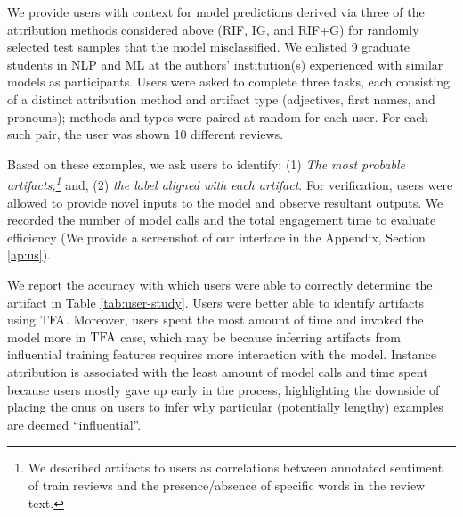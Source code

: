 \documentclass[11pt]{article}
\begin{document}
We provide %
users with context for model predictions derived via three of the attribution methods considered above (RIF, IG, and RIF+G) for randomly selected test samples that the model misclassified.
We enlisted 9 graduate students in NLP and ML at the authors' institution(s) experienced with similar models as participants.
Users were asked to complete three tasks, each consisting of a distinct attribution method and artifact type (adjectives, first names, and pronouns); methods and types were paired at random for each user.
For each such pair, the user was shown 10 different reviews. %

Based on these examples, we ask users to identify: (1) \textit{The most probable artifacts,\footnote{We described artifacts to users as correlations between annotated sentiment of train reviews and the presence/absence of specific words in the review text.}} and, (2) \textit{the label aligned with each artifact}. 
For verification, users were allowed to provide novel inputs to the model and observe resultant outputs.
We %
recorded the number of model calls and the total engagement time to
evaluate efficiency (We provide a screenshot of our interface in the Appendix, Section \ref{ap:us}).


We report the accuracy with which users were able to correctly determine the artifact in Table \ref{tab:user-study}.
Users were better able to identify artifacts %
using $\text{TFA}$. 
Moreover, users spent the most amount of time and invoked the model more in $\text{TFA}$ case, which %
may be because inferring artifacts from influential training features requires more interaction with the model.
Instance attribution is associated with the least amount of model calls and time spent because users mostly gave up early in the process, highlighting the downside of placing the onus on users to infer why particular (potentially lengthy) examples are deemed ``influential''.
\end{document}
